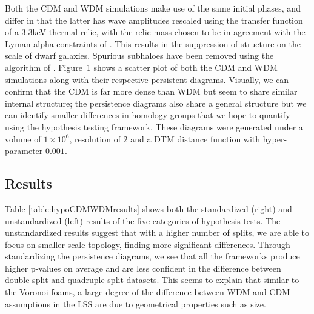 \documentclass[12pt]{article}
\newcommand{\figref}[1]{Figure~\ref{#1}}
\begin{document}
\begin{figure}[htp!]
  \label{fig:eagleDiags}
\end{figure}

Both the CDM and WDM simulations make use of the same initial phases, and differ in that the latter has wave amplitudes rescaled using the transfer function of a 3.3keV thermal relic, with the relic mass chosen to be in agreement with the Lyman-alpha constraints of \citep{viel2013warm}. This results in the suppression of structure on the scale of dwarf galaxies. Spurious subhaloes have been removed using the algorithm of \citep{lovell2014properties}. \figref{fig:eagleDiags} shows a scatter plot of both the CDM and WDM simulations along with their respective persistent diagrams. Visually, we can confirm that the CDM is far more dense than WDM but seem to share similar internal structure; the persistence diagrams also share a general structure but we can identify smaller differences in homology groups that we hope to quantify using the hypothesis testing framework. These diagrams were generated under a volume of $1\times 10^{6}$, resolution of $2$ and a DTM distance function with hyper-parameter $0.001$.

\subsection{Results}
Table \ref{table:hypoCDMWDMresults} shows both the standardized (right) and unstandardized (left) results of the five categories of hypothesis tests. The unstandardized results suggest that with a higher number of splits, we are able to focus on smaller-scale topology, finding more significant differences. Through standardizing the persistence diagrams, we see that all the frameworks produce higher p-values on average and are less confident in the difference between double-split and quadruple-split datasets. This seems to explain that similar to the Voronoi foams, a large degree of the difference between WDM and CDM assumptions in the LSS are due to geometrical properties such as size.
\end{document}
